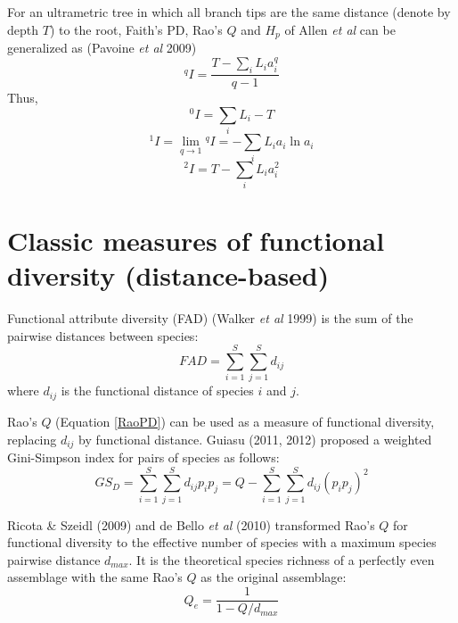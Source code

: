 \documentclass[11pt]{article}
\begin{document}
For an ultrametric tree in which all branch tips are the same distance (denote by depth $T$) to the root, Faith's PD, Rao's $Q$ and $H_p$ of Allen \textit{et al} can be generalized as (Pavoine \textit{et al} 2009)
\begin{equation}
    ^{q}I = \frac{T-\sum\limits_{i}L_ia_i^q}{q-1}
    \label{GeneralizedPD}
\end{equation}
Thus,
\begin{equation}
    ^{0}I = \sum\limits_{i}L_i - T
\end{equation}
\begin{equation}
    ^{1}I = \lim_{q\rightarrow 1} {^{q}I} = -\sum\limits_{i}L_ia_i\ln a_i
\end{equation}
\begin{equation}
    ^{2}I = T-\sum\limits_{i}L_i a_i^2
\end{equation}

\section{Classic measures of functional diversity (distance-based)}
Functional attribute diversity (FAD) (Walker \textit{et al} 1999) is the sum of the pairwise distances between species: 
\begin{equation}
    FAD = \sum\limits_{i=1}^{S}\sum\limits_{j=1}^{S}d_{ij}
    \label{FAD}
\end{equation}
where $d_{ij}$ is the functional distance of species $i$ and $j$.

\newline

Rao's $Q$ (Equation \ref{RaoPD}) can be used as a measure of functional diversity, replacing $d_{ij}$ by functional distance. 
Guiasu (2011, 2012) proposed a weighted Gini-Simpson index for pairs of species as follows:
\begin{equation}
    GS_D = \sum\limits_{i=1}^{S}\sum\limits_{j=1}^{S}d_{ij}p_ip_j = Q-\sum\limits_{i=1}^{S}\sum\limits_{j=1}^{S}d_{ij}(p_ip_j)^2
    \label{Guiasu}
\end{equation}

\newline

Ricota & Szeidl (2009) and de Bello \textit{et al} (2010) transformed Rao's $Q$ for functional diversity to the effective number of species with a maximum species pairwise distance $d_{max}$. 
It is the theoretical species richness of a perfectly even assemblage with the same Rao's $Q$ as the original assemblage:
\begin{equation}
    Q_e = \frac{1}{1-Q/d_{max}}
    \label{EffectiveRichnessQ}
\end{equation}
\end{document}
